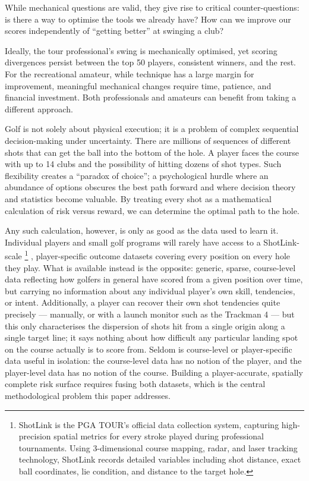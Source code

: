 \documentclass[11pt, letterpaper]{article}
\begin{document}
While mechanical questions are valid, they give rise to critical counter-questions: is there a way to optimise the tools we already have? How can we improve our scores independently of ``getting better'' at swinging a club? 

Ideally, the tour professional's swing is mechanically optimised, yet scoring divergences persist between the top 50 players, consistent winners, and the rest. For the recreational amateur, while technique has a large margin for improvement, meaningful mechanical changes require time, patience, and financial investment. Both professionals and amateurs can benefit from taking a different approach.

Golf is not solely about physical execution; it is a problem of complex sequential decision-making under uncertainty. There are  millions of sequences of different shots that can get the ball into the bottom of the hole. A player faces the course with up to 14 clubs and the possibility of hitting dozens of shot types. Such flexibility creates a ``paradox of choice''; a psychological hurdle where an abundance of options obscures the best path forward \parencite{schwartz2015paradox} and where decision theory and statistics become valuable. By treating every shot as a mathematical calculation of risk versus reward, we can determine the optimal path to the hole. 


Any such calculation, however, is only as good as the data used to learn it. Individual players and small golf programs will rarely have access to a ShotLink-scale \footnote{ShotLink is the PGA TOUR's official data collection system, capturing high-precision spatial metrics for every stroke played during professional tournaments. Using 3-dimensional course mapping, radar, and laser tracking technology, ShotLink records detailed variables including shot distance, exact ball coordinates, lie condition, and distance to the target hole.} \parencite{shotlink2026}, player-specific outcome datasets covering every position on every hole they play. What is available instead is the opposite: generic, sparse, course-level data reflecting how golfers in general have scored from a given position over time, but carrying no information about any individual player's own skill, tendencies, or intent. Additionally, a player can recover their own shot tendencies quite precisely --- manually, or with a launch monitor such as the Trackman 4 \parencite{trackman2026} --- but this only characterises the dispersion of shots hit from a single origin along a single target line; it says nothing about how difficult any particular landing spot on the course actually is to score from. Seldom is course-level or player-specific data useful in isolation: the course-level data has no notion of the player, and the player-level data has no notion of the course. Building a player-accurate, spatially complete risk surface requires fusing both datasets, which is the central methodological problem this paper addresses.
\end{document}
